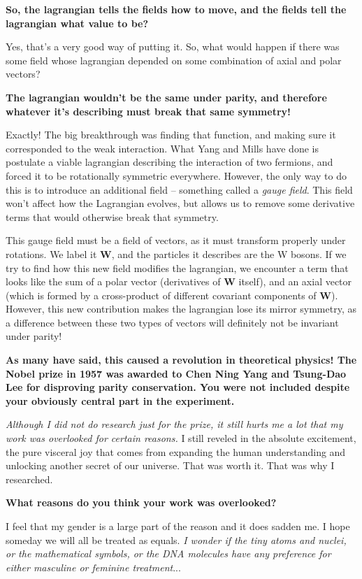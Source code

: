 \documentclass{article}
\newcommand{\q}[1]{\vspace{10pt}
\textbf{#1}}
\begin{document}
\begin{multicols}{2}
\q{So, the lagrangian tells the fields how to move, and the fields tell the lagrangian what value to be?}

Yes, that’s a very good way of putting it. So, what would happen if there was some field whose lagrangian depended on some combination of axial and polar vectors?

\q{The lagrangian wouldn’t be the same under parity, and therefore whatever it’s describing must break that same symmetry!}

Exactly! The big breakthrough was finding that function, and making sure it corresponded to the weak interaction. What Yang and Mills have done is postulate a viable lagrangian describing the interaction of two fermions, and forced it to be rotationally symmetric everywhere. However, the only way to do this is to introduce an additional field – something called a \textit{gauge field}. This field won’t affect how the Lagrangian evolves, but allows us to remove some derivative terms that would otherwise break that symmetry.

This gauge field must be a field of vectors, as it must transform properly under rotations. We label it \textbf{W}, and the particles it describes are the W bosons. If we try to find how this new field modifies the lagrangian, we encounter a term that looks like the sum of a polar vector (derivatives of \textbf{W} itself), and an axial vector (which is formed by a cross-product of different covariant components of \textbf{W})\cite{J1}. However, this new contribution makes the lagrangian lose its mirror symmetry, as a difference between these two types of vectors will definitely not be invariant under parity!

\q{As many have said, this caused a revolution in theoretical physics! The Nobel prize in 1957 was awarded to Chen Ning Yang and Tsung-Dao Lee for disproving parity conservation\cite{N8}. You were not included despite your obviously central part in the experiment.}

\textit{Although I did not do research just for the prize, it still hurts me a lot that my work was overlooked for certain reasons.} I still reveled in the absolute excitement, the pure visceral joy that comes from expanding the human understanding and unlocking another secret of our universe. That was worth it. That was why I researched.

\q{What reasons do you think your work was overlooked?}

I feel that my gender is a large part of the reason and it does sadden me\cite{N15}. I hope someday we will all be treated as equals. \textit{I wonder if the tiny atoms and nuclei, or the mathematical symbols, or the DNA molecules have any preference for either masculine or feminine treatment}\cite{N9}...


\end{multicols}
\end{document}
